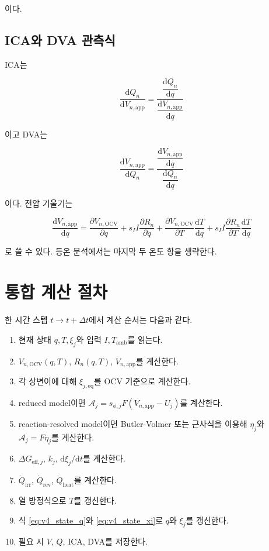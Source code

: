 \documentclass[11pt,a4paper]{article}
\newcommand{\dd}{\mathrm{d}}
\newcommand{\OCV}{\mathrm{OCV}}
\newcommand{\app}{\mathrm{app}}
\newcommand{\eff}{\mathrm{eff}}
\newcommand{\eq}{\mathrm{eq}}
\begin{document}
이다.

\subsection{ICA와 DVA 관측식}
ICA는

\begin{equation}
\frac{\dd Q_n}{\dd V_{n,\app}}=\frac{\dfrac{\dd Q_n}{\dd q}}{\dfrac{\dd V_{n,\app}}{\dd q}}
\label{eq:v4_obs_ica}
\end{equation}

이고 DVA는

\begin{equation}
\frac{\dd V_{n,\app}}{\dd Q_n}=\frac{\dfrac{\dd V_{n,\app}}{\dd q}}{\dfrac{\dd Q_n}{\dd q}}
\label{eq:v4_obs_dva}
\end{equation}

이다. 전압 기울기는

\begin{equation}
\frac{\dd V_{n,\app}}{\dd q}=\frac{\partial V_{n,\OCV}}{\partial q}+s_II\frac{\partial R_n}{\partial q}+\frac{\partial V_{n,\OCV}}{\partial T}\frac{\dd T}{\dd q}+s_II\frac{\partial R_n}{\partial T}\frac{\dd T}{\dd q}
\label{eq:v4_dVdq_temp}
\end{equation}

로 쓸 수 있다. 등온 분석에서는 마지막 두 온도 항을 생략한다.

\section{통합 계산 절차}
한 시간 스텝 \(t\to t+\Delta t\)에서 계산 순서는 다음과 같다.

\begin{enumerate}[label=\arabic*)]
\item 현재 상태 \(q,T,\xi_j\)와 입력 \(I,T_{\mathrm{amb}}\)를 읽는다.
\item \(V_{n,\OCV}(q,T)\), \(R_n(q,T)\), \(V_{n,\app}\)를 계산한다.
\item 각 상변이에 대해 \(\xi_{j,\eq}\)를 OCV 기준으로 계산한다.
\item reduced model이면 \(\mathcal A_j=s_{\phi,j}F(V_{n,\app}-U_j)\)를 계산한다.
\item reaction-resolved model이면 Butler-Volmer 또는 근사식을 이용해 \(\eta_j\)와 \(\mathcal A_j=F\eta_j\)를 계산한다.
\item \(\Delta G_{\eff,j}\), \(k_j\), \(\dd\xi_j/\dd t\)를 계산한다.
\item \(\dot Q_{\mathrm{irr}}\), \(\dot Q_{\mathrm{rev}}\), \(\dot Q_{\mathrm{heat}}\)를 계산한다.
\item 열 방정식으로 \(T\)를 갱신한다.
\item 식 \eqref{eq:v4_state_q}와 \eqref{eq:v4_state_xi}로 \(q\)와 \(\xi_j\)를 갱신한다.
\item 필요 시 \(V\), \(Q\), ICA, DVA를 저장한다.
\end{enumerate}
\end{document}
